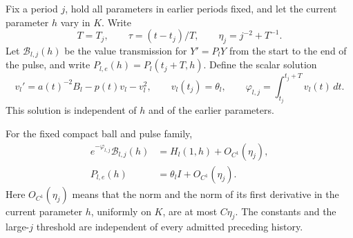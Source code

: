 Fix a period \(j\), hold all parameters in earlier periods fixed,
and let the current parameter \(h\) vary in \(K\).  Write
\[
 T=T_j,\qquad \tau=(t-t_j)/T,\qquad
 \eta_j=j^{-2}+T^{-1}.
\]
Let \(\mathcal B_{l,j}(h)\) be the value transmission for
\(Y'=P_lY\) from the start to the end of the pulse, and write
\(P_{l,e}(h)=P_l(t_j+T,h)\).  Define the scalar solution
\begin{equation}
 v_l'=a(t)^{-2}B_l-p(t)v_l-v_l^2,\qquad
 v_l(t_j)=\theta_l,\qquad
 \varphi_{l,j}=\int_{t_j}^{t_j+T}v_l(t)\,dt.
 \label{eq:scalar-baseline}
\end{equation}
This solution is independent of \(h\) and of the earlier
parameters.

\begin{lemma}
\label{lem:pulse}
For the fixed compact ball and pulse family,
\begin{equation}
 \begin{aligned}
 e^{-\varphi_{l,j}}\mathcal B_{l,j}(h)
     &=H_l(1,h)+O_{C^1}(\eta_j),\\
 P_{l,e}(h)&=\theta_lI+O_{C^1}(\eta_j).
 \end{aligned}
 \label{eq:pulse-limit}
\end{equation}
Here \(O_{C^1}(\eta_j)\) means that the norm and the norm of its
first derivative in the current parameter \(h\), uniformly on
\(K\), are at most \(C\eta_j\).  The constants and the large-\(j\)
threshold are independent of every admitted preceding history.
\end{lemma}

